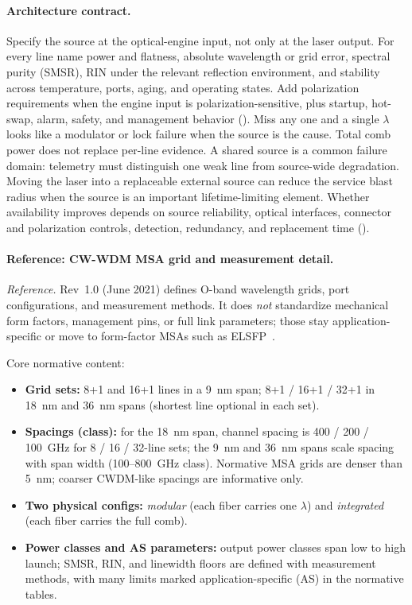\paragraph{Architecture contract.}
Specify the source at the optical-engine input, not only at the laser output.
For every line name power and flatness, absolute wavelength or grid error,
spectral purity (SMSR), RIN under the relevant reflection environment, and
stability across temperature, ports, aging, and operating states. Add
polarization requirements when the engine input is polarization-sensitive, plus
startup, hot-swap, alarm, safety, and management behavior
(). Miss any one and a
single $\lambda$ looks like a modulator or lock failure when the source is the
cause. Total comb power does not replace per-line evidence. A shared source is a
common failure domain: telemetry must distinguish one weak line from source-wide
degradation. Moving the laser into a replaceable external source can reduce the
service blast radius when the source is an important lifetime-limiting element.
Whether availability improves depends on source reliability, optical interfaces,
connector and polarization controls, detection, redundancy, and replacement time
().

\paragraph{Reference: CW-WDM MSA grid and measurement detail.}
\textit{Reference.} Rev~1.0 (June 2021) defines O-band wavelength grids, port
configurations, and measurement methods. It does \emph{not} standardize
mechanical form factors, management pins, or full link parameters; those stay
application-specific or move to form-factor MSAs such as
ELSFP~.

Core normative content:
\begin{itemize}
\item \textbf{Grid sets:} 8+1 and 16+1 lines in a 9~nm span; 8+1 / 16+1 / 32+1 in
      18~nm and 36~nm spans (shortest line optional in each set).
\item \textbf{Spacings (class):} for the 18~nm span, channel spacing is 400 / 200 /
      100~GHz for 8 / 16 / 32-line sets; the 9~nm and 36~nm spans scale spacing
      with span width (100--800~GHz class). Normative MSA grids are denser than
      5~nm; coarser CWDM-like spacings are informative only.
\item \textbf{Two physical configs:} \emph{modular} (each fiber carries one
      $\lambda$) and \emph{integrated} (each fiber carries the full comb).
\item \textbf{Power classes and AS parameters:} output power classes span low to
      high launch; SMSR, RIN, and linewidth floors are defined with measurement
      methods, with many limits marked application-specific (AS) in the normative
      tables.
\end{itemize}


